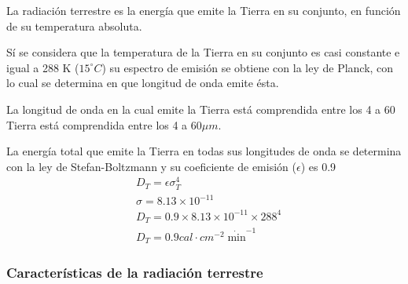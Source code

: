 La radiación terrestre es la energía que
emite la Tierra en su conjunto, en función
de su temperatura absoluta.


Sí se considera que la temperatura de la Tierra en su conjunto es casi constante e igual a 288 K ($15^{\circ}C$) su espectro de emisión se obtiene con la ley de Planck, con lo cual se determina en que longitud de onda emite ésta.

La longitud de onda en la cual emite la Tierra está comprendida entre los 4 a 60 Tierra está comprendida entre los 4 a 60$\mu m$.

La energía total que emite la Tierra en todas sus longitudes de onda se determina con la ley de Stefan-Boltzmann y su coeficiente de emisión ($\epsilon$) es 0.9
\begin{align}
    &D_T = \epsilon \sigma_T^4 \\ 
    &\sigma = 8.13 \times 10^{ - 11}\\
    &D_T = 0.9 \times 8.13 \times 10^{ - 11} \times 288^4\\
    &D_T = 0.9 cal\cdot cm^{ - 2}\dot \min^{ -1}
\end{align}

\subsubsection{Características de la radiación terrestre}

